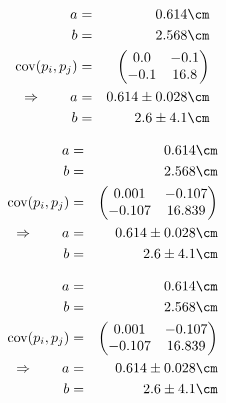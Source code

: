 \begin{eqnarray}
    a &=& 0.614 \cm \nonumber \\
    b &=& 2.568 \cm \nonumber \\
    \mathrm{cov}(p_i, p_j) &=& 
    \begin{pmatrix}
        0.0 &-0.1 \\
        -0.1 &16.8 \\
    \end{pmatrix}
\\ \Rightarrow \qquad
    a &=& 0.614 \pm 0.028 \cm\\
    b &=& 2.6 \pm 4.1 \cm
\end{eqnarray}

\begin{eqnarray}
    a &=& 0.614 \cm \nonumber \\
    b &=& 2.568 \cm \nonumber \\
    \mathrm{cov}(p_i, p_j) &=& 
    \begin{pmatrix}
        0.001 &-0.107 \\
        -0.107 &16.839 \\
    \end{pmatrix}
\\ \Rightarrow \qquad
    a &=& 0.614 \pm 0.028 \cm\\
    b &=& 2.6 \pm 4.1 \cm
\end{eqnarray}

\begin{eqnarray}
    a &=& 0.614 \cm \nonumber \\
    b &=& 2.568 \cm \nonumber \\
    \mathrm{cov}(p_i, p_j) &=& 
    \begin{pmatrix}
        0.001 &-0.107 \\
        -0.107 &16.839 \\
    \end{pmatrix}
\\ \Rightarrow \qquad
    a &=& 0.614 \pm 0.028 \cm\\
    b &=& 2.6 \pm 4.1 \cm
\end{eqnarray}

